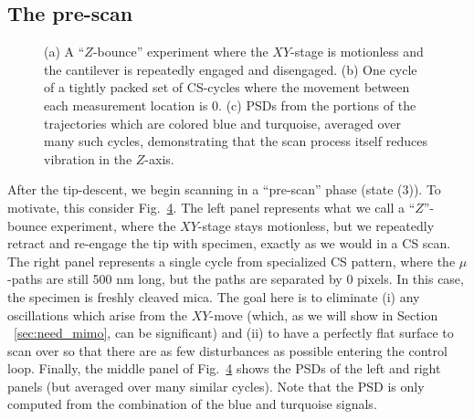 \documentclass[twocolumn,twoside]{IEEEtran/IEEEtran}
\begin{document}
\subsection{The pre-scan}
\begin{figure}
  \begin{subfigure}{.33\textwidth}
    
    \caption{ }
    \label{fig: }
  \end{subfigure}
  \begin{subfigure}{.33\textwidth}
    
    \caption{ }
    \label{fig:uz_prescan}
  \end{subfigure}
  \begin{subfigure}{.33\textwidth}
    
    \caption{ }
    \label{fig: }
  \end{subfigure}
  \caption{(a) A ``$Z$-bounce'' experiment where the $XY$-stage is motionless
    and the cantilever is repeatedly engaged and disengaged. (b) One cycle of a
    tightly packed set of CS-cycles where the movement between each measurement
    location is 0. (c) PSDs from the portions of the trajectories which are
    colored blue and turquoise, averaged over many such cycles, demonstrating
    that the scan process itself reduces vibration in the $Z$-axis.}
  \label{fig:prescan_difference}
\end{figure}
After the tip-descent, we begin scanning in a ``pre-scan'' phase (state (3)). To
motivate, this consider Fig.~\ref{fig:prescan_difference}. The left panel
represents what we call a ``$Z$''-bounce experiment, where the $XY$-stage stays
motionless, but we repeatedly retract and re-engage the tip with specimen,
exactly as we would in a CS scan. The right panel represents a single cycle from
specialized CS pattern, where the $\mu$-paths are still 500 nm long, but the
paths are separated by 0 pixels. In this case, the specimen is freshly cleaved
mica. The goal here is to eliminate (i) any oscillations which arise from the
$XY$-move (which, as we will show in Section ~\ref{sec:need_mimo}, can be
significant) and (ii) to have a perfectly flat surface to scan over so that
there are as few disturbances as possible entering the control loop. Finally,
the middle panel of Fig.~\ref{fig:prescan_difference} shows the PSDs of the left
and right panels (but averaged over many similar cycles). Note that the PSD is
only computed from the combination of the blue and turquoise signals.
\end{document}
